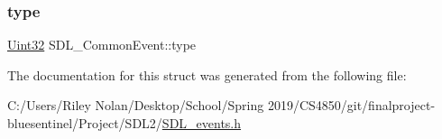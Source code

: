 \subsubsection{\texorpdfstring{type}{type}}
{\footnotesize\ttfamily \mbox{\hyperlink{_s_d_l__stdinc_8h_add440eff171ea5f55cb00c4a9ab8672d}{Uint32}} S\+D\+L\+\_\+\+Common\+Event\+::type}



The documentation for this struct was generated from the following file\+:\begin{DoxyCompactItemize}
\item 
C\+:/\+Users/\+Riley Nolan/\+Desktop/\+School/\+Spring 2019/\+C\+S4850/git/finalproject-\/bluesentinel/\+Project/\+S\+D\+L2/\mbox{\hyperlink{_s_d_l__events_8h}{S\+D\+L\+\_\+events.\+h}}\end{DoxyCompactItemize}
